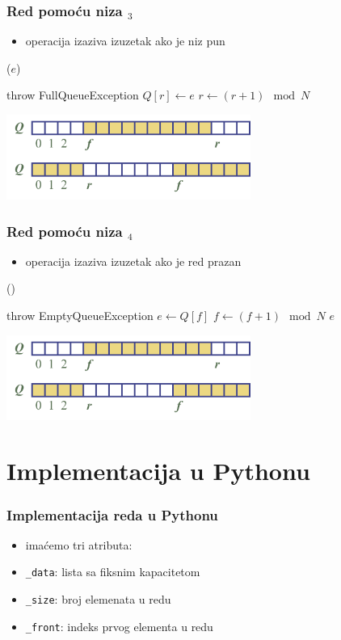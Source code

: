 \documentclass[compress]{beamer}
\begin{document}
\begin{frame}[fragile]
  \frametitle{Red pomoću niza $_3$}
  \begin{itemize}
    \item operacija  izaziva izuzetak ako je niz pun
  \end{itemize}
($e$)
\begin{algorithmic}
  \STATE throw FullQueueException
\ELSE
  \STATE $Q[r] \leftarrow e$
  \STATE $r \leftarrow (r+1)\mod N$
\ENDIF
\end{algorithmic}
\begin{center}
  \includegraphics[width=8cm]{asp-06-pic02.png}
\end{center}
\end{frame}

\begin{frame}[fragile]
  \frametitle{Red pomoću niza $_4$}
  \begin{itemize}
    \item operacija  izaziva izuzetak ako je red prazan
  \end{itemize}
()
\begin{algorithmic}
  \STATE throw EmptyQueueException
\ELSE
  \STATE $e \leftarrow Q[f]$
  \STATE $f \leftarrow (f+1)\mod N$
  \RETURN $e$
\ENDIF
\end{algorithmic}
\begin{center}
  \includegraphics[width=8cm]{asp-06-pic02.png}
\end{center}
\end{frame}

\section[Python impl]{Implementacija u Pythonu}
\begin{frame}[fragile]
  \frametitle{Implementacija reda u Pythonu}
  \begin{itemize}
    \item imaćemo tri atributa:
    \item \texttt{\_data}: lista sa fiksnim kapacitetom
    \item \texttt{\_size}: broj elemenata u redu
    \item \texttt{\_front}: indeks prvog elementa u redu
  \end{itemize}
\end{frame}
\end{document}
